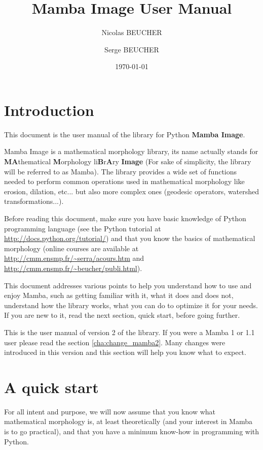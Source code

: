 \documentclass[a4paper,10pt,oneside]{article}
\title{Mamba Image User Manual}
\author{Nicolas BEUCHER \and Serge BEUCHER}
\date{\today}
\begin{document}
\mambaCover
\mambaContent
\mambaFigures

\section{Introduction}

This document is the user manual of the library for Python \textbf{Mamba Image}.

Mamba Image is a mathematical morphology library, its name actually stands for 
\textbf{MA}thematical \textbf{M}orphology li\textbf{B}r\textbf{A}ry \textbf{Image} 
(For sake of simplicity, the library will be referred to as Mamba). The library 
provides a wide set of functions needed to perform common operations used in 
mathematical morphology like erosion, dilation, etc... but also more complex ones
(geodesic operators, watershed transformations...).

Before reading this document, make sure you have basic knowledge of Python
programming language (see the Python tutorial at 
\url{http://docs.python.org/tutorial/}) and that you know the basics of 
mathematical morphology (online courses are available at 
\url{http://cmm.ensmp.fr/~serra/acours.htm} and \url{http://cmm.ensmp.fr/~beucher/publi.html}).

This document addresses various points to help you understand how to use and
enjoy Mamba, such as getting familiar with it, what it does and does not,
understand how the library works, what you can do to optimize it for your
needs. If you are new to it, read the next section, quick start, before going
further.

This is the user manual of version 2 of the library. If you were a Mamba 1 or
1.1 user please read the section \ref{cha:change_mamba2}. Many changes
were introduced in this version and this section will help you know what to
expect.

\pagebreak

\section{A quick start}

For all intent and purpose, we will now assume that you know what mathematical
morphology is, at least theoretically (and your interest in Mamba is to go 
practical), and that you have a minimum know-how in programming with Python.
\end{document}
